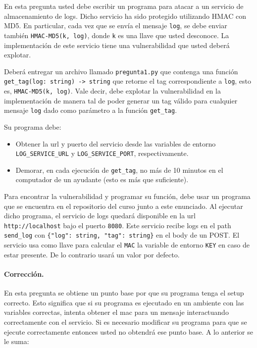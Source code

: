 
En esta pregunta usted debe escribir un programa para atacar a un servicio de almacenamiento de logs. Dicho servicio ha sido protegido utilizando HMAC con MD5.
En particular, cada vez que se envía el mensaje \texttt{log}, se debe enviar también \texttt{HMAC-MD5(k, log)}, donde \texttt{k} es una llave que usted desconoce. La implementación de este servicio tiene una vulnerabilidad que usted deberá explotar.

Deberá entregar un archivo llamado \texttt{pregunta1.py} que contenga una función \texttt{get\_tag(log: string) -> string} que retorne el tag correspondiente a \texttt{log}, esto es, \texttt{HMAC-MD5(k, log)}. Vale decir, debe explotar la vulnerabilidad en la implementación de manera tal de poder generar un tag válido para cualquier mensaje \texttt{log} dado como parámetro a la función \texttt{get\_tag}.

Su programa debe:
\begin{itemize}
  \item Obtener la url y puerto del servicio desde las variables de entorno \texttt{LOG\_SERVICE\_URL} y \texttt{LOG\_SERVICE\_PORT}, respectivamente.
  \item Demorar, en cada ejecución de \texttt{get\_tag}, no más de 10 minutos en el computador de un ayudante (esto es más que suficiente).
\end{itemize}

Para encontrar la vulnerabilidad y programar su función, debe usar un programa que se encuentra en el repositorio del curso junto a este enunciado. Al ejecutar dicho programa, el servicio de logs quedará disponible en la url \texttt{http://localhost} bajo el puerto \texttt{8080}. Este servicio recibe logs en el path \texttt{send\_log} con \texttt{\{"log": string, "tag": string\}} en el body de un POST. El servicio usa como llave para calcular el \texttt{MAC} la variable de entorno \texttt{KEY} en caso de estar presente. De lo contrario usará un valor por defecto. 



\medskip

\paragraph{Corrección.} En esta pregunta se obtiene un punto base por que su programa tenga el setup correcto. Esto significa que si su programa es ejecutado en un ambiente con las variables correctas, intenta obtener el mac para un mensaje interactuando correctamente con el servicio. Si es necesario modificar su programa para que se ejecute correctamente entonces usted no obtendrá ese punto base. A lo anterior se le suma:

